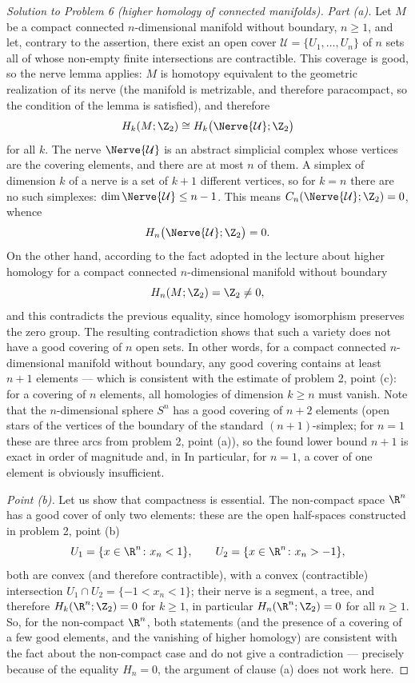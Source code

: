 \documentclass[a4paper,12pt]{report}
\begin{document}
\begin{proof}[Solution to Problem \textup{6} \textup{(}higher homology of connected manifolds\textup{)}]
\textit{Part \textup{(a)}.} Let $M$ be a compact connected $n$-dimensional manifold without boundary, $n\ge1$, and let, contrary to the assertion, there exist an open cover $\mathcal U=\{U_1,\dots,U_n\}$ of $n$ sets all of whose non-empty finite intersections are contractible. This coverage is good, so the nerve lemma applies: $M$ is homotopy equivalent to the geometric realization of its nerve \textup{(}the manifold is metrizable, and therefore paracompact, so the condition of the lemma is satisfied\textup{)}, and therefore
\[
H_k(M;\Z_2)\cong H_k\bigl(\Nerve{\mathcal U};\Z_2\bigr)
\]
for all $k$. The nerve $\Nerve{\mathcal U}$ is an abstract simplicial complex whose vertices are the covering elements, and there are at most $n$ of them. A simplex of dimension $k$ of a nerve is a set of $k+1$ different vertices, so for $k=n$ there are no such simplexes: $\dim\Nerve{\mathcal U}\le n-1$. This means $C_n(\Nerve{\mathcal U};\Z_2)=0$, whence
\[
H_n\bigl(\Nerve{\mathcal U};\Z_2\bigr)=0 .
\]
On the other hand, according to the fact adopted in the lecture about higher homology for a compact connected $n$-dimensional manifold without boundary
\[
H_n(M;\Z_2)=\Z_2\ne0 ,
\]
and this contradicts the previous equality, since homology isomorphism preserves the zero group. The resulting contradiction shows that such a variety does not have a good covering of $n$ open sets. In other words, for a compact connected $n$-dimensional manifold without boundary, any good covering contains at least $n+1$ elements --- which is consistent with the estimate of problem \textup{2}, point \textup{(c)}: for a covering of $n$ elements, all homologies of dimension $k\ge n$ must vanish. Note that the $n$-dimensional sphere $S^n$ has a good covering of $n+2$ elements \textup{(}open stars of the vertices of the boundary of the standard $(n+1)$-simplex; for $n=1$ these are three arcs from problem \textup{2}, point \textup{(a)}\textup{)}, so the found lower bound $n+1$ is exact in order of magnitude and, in In particular, for $n=1$, a cover of one element is obviously insufficient.

\textit{Point \textup{(b)}.} Let us show that compactness is essential. The non-compact space $\R^n$ has a good cover of only two elements: these are the open half-spaces constructed in problem \textup{2}, point \textup{(b)}
\[
U_1=\{x\in\R^n\colon x_n<1\},\qquad U_2=\{x\in\R^n\colon x_n>-1\},
\]
both are convex \textup{(}and therefore contractible\textup{)}, with a convex \textup{(}contractible\textup{)} intersection $U_1\cap U_2=\{-1<x_n<1\}$; their nerve is a segment, a tree, and therefore $H_k(\R^n;\Z_2)=0$ for $k\ge1$, in particular $H_n(\R^n;\Z_2)=0$ for all $n\ge1$. So, for the non-compact $\R^n$, both statements \textup{(}and the presence of a covering of a few good elements, and the vanishing of higher homology\textup{)} are consistent with the fact about the non-compact case and do not give a contradiction --- precisely because of the equality $H_n=0$, the argument of clause \textup{(a)} does not work here.


\end{proof}
\end{document}
